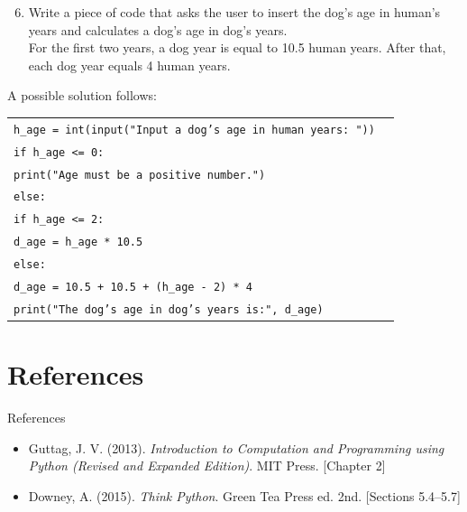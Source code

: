 \documentclass[t,handout,9pt]{beamer}
\begin{document}
\begin{frame}
\vfill
\begin{enumerate}
\setcounter{enumi}{5}
	\item Write a piece of code that asks the user to insert the dog's age in human's years and calculates a dog's age in dog's years.\\For the first two years, a dog year is equal to 10.5 human years. After that, each dog year equals 4 human years.
\end{enumerate}
A possible solution follows:
\begin{table}[]
	\begin{tabular}{ll}
	\texttt{h\_age = int(input("Input a dog's age in human years: "))} & \\
	\texttt{if h\_age <= 0:} & \\
	\texttt{\qquad print("Age must be a positive number.")} & \\
	\texttt{else:} & \\
	\texttt{\qquad if h\_age <= 2:} & \\
	\texttt{\qquad\qquad d\_age = h\_age * 10.5} & \\
	\texttt{\qquad else:} & \\
	\texttt{\qquad\qquad d\_age = 10.5 + 10.5 + (h\_age - 2) * 4} & \\
	\texttt{\qquad print("The dog's age in dog's years is:", d\_age)} & \\
	\end{tabular}
	\end{table}
\vfill
\end{frame}
\section{References}
\begin{frame}{References}
\begin{itemize}
	\item Guttag, J. V. (2013). \textit{Introduction to Computation and Programming using Python (Revised and Expanded Edition)}. MIT Press. [Chapter 2]
	\item Downey, A. (2015). \textit{Think Python}. Green Tea Press ed. 2nd. [Sections 5.4--5.7]
\end{itemize}
\end{frame}
\end{document}
